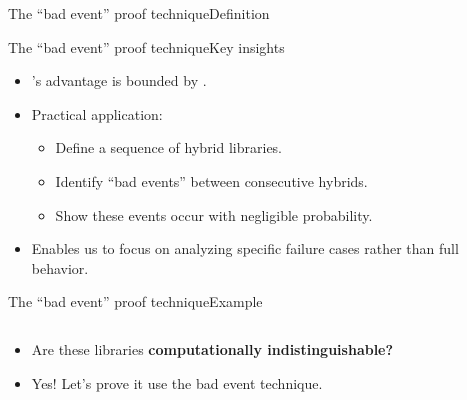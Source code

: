 \documentclass[aspectratio=169, lualatex, handout]{beamer}
\begin{document}
\begin{frame}{The ``bad event'' proof technique}{Definition}
\end{frame}

\begin{frame}{The ``bad event'' proof technique}{Key insights}
	\begin{itemize}
		\item \prog{}'s advantage is bounded by .
		\item Practical application:
		      \begin{itemize}
			      \item Define a sequence of hybrid libraries.
			      \item Identify ``bad events'' between consecutive hybrids.
			      \item Show these events occur with negligible probability.
		      \end{itemize}
		\item Enables us to focus on analyzing specific failure cases rather than full behavior.
	\end{itemize}
\end{frame}

\begin{frame}{The ``bad event'' proof technique}{Example}
	\begin{columns}[c]
		\begin{column}{0.5\textwidth}
			\begin{itemize}[<+->]
				\item Are these libraries \textbf{computationally indistinguishable?}
				\item Yes! Let's prove it use the bad event technique.
			\end{itemize}
		\end{column}
		\begin{column}{0.5\textwidth}
		\end{column}
	\end{columns}
\end{frame}
\end{document}
